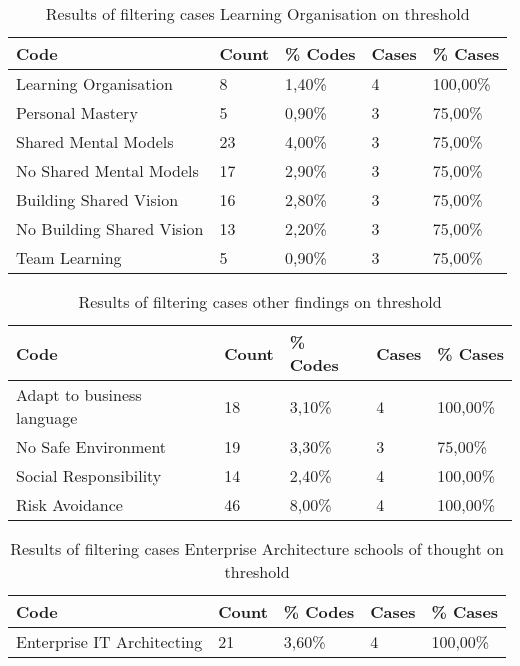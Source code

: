 \begin{table}[htbp]
	\centering
	\begin{tabular}{lllll}
		\toprule
		\textbf{Code} & \textbf{Count} & \textbf{\% Codes} &\textbf{Cases} & \textbf{\% Cases} \\
		\midrule
		Learning Organisation & 8     & 1,40\% & 4     & 100,00\% \\
		Personal Mastery & 5     & 0,90\% & 3     & 75,00\% \\
		Shared Mental Models & 23    & 4,00\% & 3     & 75,00\% \\
		No Shared Mental Models & 17    & 2,90\% & 3     & 75,00\% \\
		Building Shared Vision & 16    & 2,80\% & 3     & 75,00\% \\
		No Building Shared Vision & 13    & 2,20\% & 3     & 75,00\% \\
		Team Learning & 5     & 0,90\% & 3     & 75,00\% \\
		\bottomrule
	\end{tabular}%
	\caption{Results of filtering cases Learning Organisation on threshold}%
	\label{tab:resultsfilteringlearningorganisation}%
\end{table}%

\begin{table}[htbp]
	\centering
	\begin{tabular}{lllll}
		\toprule
		\textbf{Code} & \textbf{Count} & \textbf{\% Codes} &\textbf{Cases} & \textbf{\% Cases} \\
		\midrule
		Adapt to business language & 18    & 3,10\% & 4     & 100,00\% \\
		No Safe Environment & 19    & 3,30\% & 3     & 75,00\% \\
		Social Responsibility & 14    & 2,40\% & 4     & 100,00\% \\
		Risk Avoidance & 46    & 8,00\% & 4     & 100,00\% \\
		\bottomrule
	\end{tabular}%
	\caption{Results of filtering cases other findings on threshold}%
	\label{tab:resultsfilteringotherfindings}%
\end{table}%

\begin{table}[htbp]
	\centering
	\begin{tabular}{lllll}
		\toprule
		\textbf{Code} & \textbf{Count} & \textbf{\% Codes} &\textbf{Cases} & \textbf{\% Cases} \\
		\midrule
		Enterprise IT Architecting	& 21	& 3,60\%	& 4	& 100,00\% \\%
		\bottomrule
	\end{tabular}%
	\caption{Results of filtering cases Enterprise Architecture schools of thought on threshold}%
	\label{tab:resultsfilteringenterprisearchitecture}%
\end{table}%

